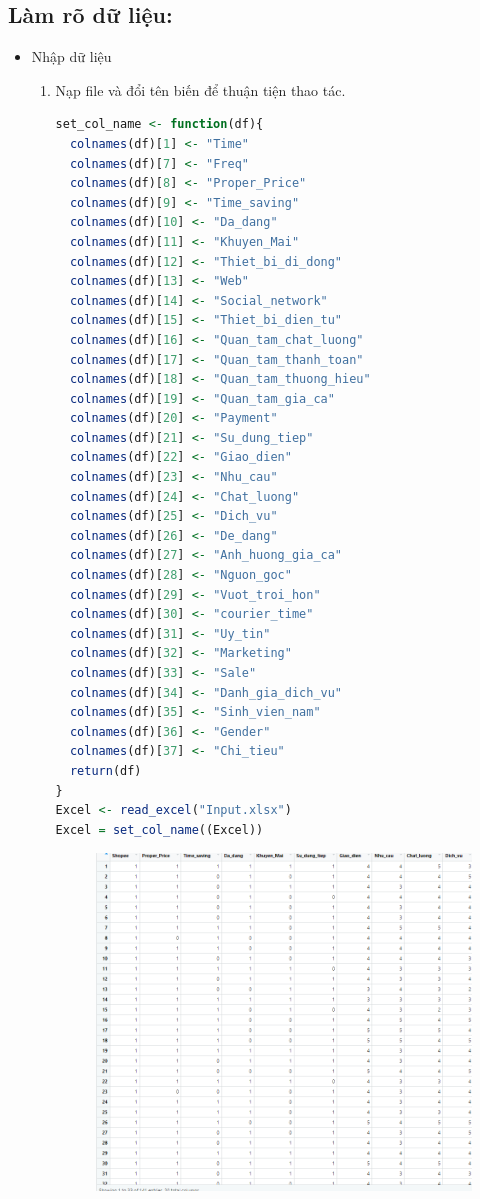 \documentclass[a4paper]{article}
\theoremstyle{definition}
\begin{document}
\begin{itemize}
\subsection{Làm rõ dữ liệu:}
    \begin{itemize}
    \item Nhập dữ liệu
    \begin{enumerate}
\item Nạp file và đổi tên biến để thuận tiện thao tác.
\begin{lstlisting}[language=R, caption=Nhập dữ liệu]
set_col_name <- function(df){
  colnames(df)[1] <- "Time"
  colnames(df)[7] <- "Freq"
  colnames(df)[8] <- "Proper_Price"
  colnames(df)[9] <- "Time_saving"
  colnames(df)[10] <- "Da_dang"
  colnames(df)[11] <- "Khuyen_Mai"
  colnames(df)[12] <- "Thiet_bi_di_dong"
  colnames(df)[13] <- "Web"
  colnames(df)[14] <- "Social_network"
  colnames(df)[15] <- "Thiet_bi_dien_tu"
  colnames(df)[16] <- "Quan_tam_chat_luong"
  colnames(df)[17] <- "Quan_tam_thanh_toan"
  colnames(df)[18] <- "Quan_tam_thuong_hieu"
  colnames(df)[19] <- "Quan_tam_gia_ca"
  colnames(df)[20] <- "Payment"
  colnames(df)[21] <- "Su_dung_tiep"
  colnames(df)[22] <- "Giao_dien"
  colnames(df)[23] <- "Nhu_cau"
  colnames(df)[24] <- "Chat_luong"
  colnames(df)[25] <- "Dich_vu"
  colnames(df)[26] <- "De_dang"
  colnames(df)[27] <- "Anh_huong_gia_ca"
  colnames(df)[28] <- "Nguon_goc"
  colnames(df)[29] <- "Vuot_troi_hon"
  colnames(df)[30] <- "courier_time"
  colnames(df)[31] <- "Uy_tin"
  colnames(df)[32] <- "Marketing"
  colnames(df)[33] <- "Sale"
  colnames(df)[34] <- "Danh_gia_dich_vu"
  colnames(df)[35] <- "Sinh_vien_nam"
  colnames(df)[36] <- "Gender"
  colnames(df)[37] <- "Chi_tieu"
  return(df)
}
Excel <- read_excel("Input.xlsx")
Excel = set_col_name((Excel))
\end{lstlisting}
\newpage 
    \begin{figure}[H]
        \centering
        \includegraphics[scale=0.55]{rieng_1.png}

\end{figure}
\end{enumerate}
\end{itemize}
\end{itemize}
\end{document}
